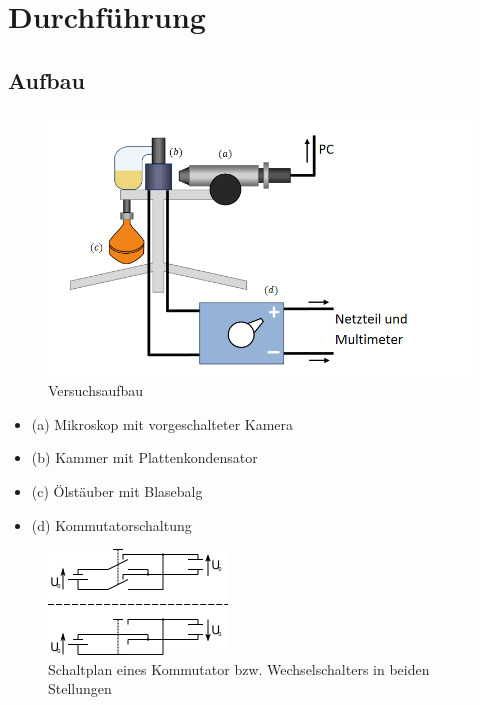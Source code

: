 \documentclass{scrartcl}
\begin{document}
\section{Durchführung}
	\subsection{Aufbau}
		\begin{figure}[H]
			\centering
			\includegraphics[width=1.0\textwidth]{Versuchsaufbau.PNG}
			\caption{Versuchsaufbau}
			\label{versuchsaufbau}
		\end{figure}
		\begin{itemize}
			\item (a) Mikroskop mit vorgeschalteter Kamera
			\item (b) Kammer mit Plattenkondensator
			\item (c) Ölstäuber mit Blasebalg
			\item (d) Kommutatorschaltung
		\end{itemize}
		\begin{figure}[H]
			\centering
			\includegraphics[width=.5\textwidth]{kommutator.png}
			\caption{Schaltplan eines Kommutator bzw. Wechselschalters in beiden Stellungen}
			\label{Kommutator } 
		\end{figure}
\end{document}
